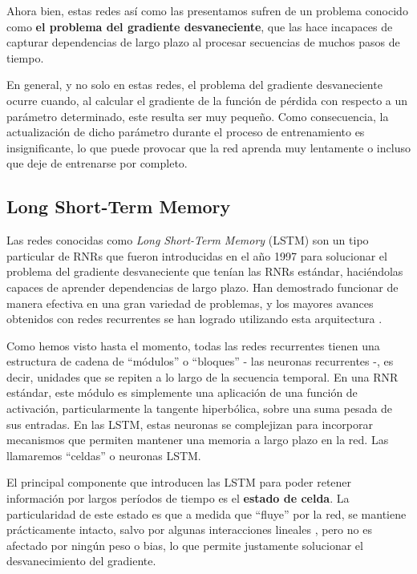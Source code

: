 \documentclass[../../main.tex]{subfiles}
\begin{document}
Ahora bien, estas redes así como las presentamos sufren de un problema conocido como
\textbf{el problema del gradiente desvaneciente}, que las hace incapaces de capturar
dependencias de largo plazo al procesar secuencias de muchos pasos de tiempo.

En general, y no solo en estas redes, el problema del gradiente desvaneciente ocurre
cuando, al calcular el gradiente de la función de pérdida con respecto a un parámetro
determinado, este resulta ser muy pequeño. Como consecuencia, la actualización de dicho
parámetro durante el proceso de entrenamiento es insignificante, lo que puede provocar que
la red aprenda muy lentamente o incluso que deje de entrenarse por completo.

\subsection{Long Short-Term Memory}
Las redes conocidas como \textit{Long Short-Term Memory} (LSTM) son un tipo particular de
RNRs que fueron introducidas en el año 1997 \cite{lstm-paper-1997} para solucionar el
problema del gradiente desvaneciente que tenían las RNRs estándar, haciéndolas capaces
de aprender dependencias de largo plazo. Han demostrado funcionar de manera efectiva en
una gran variedad de problemas, y los mayores avances obtenidos con redes recurrentes se
han logrado utilizando esta arquitectura \cite{colahs-blog-lstm-2015}.

Como hemos visto hasta el momento, todas las redes recurrentes tienen una estructura de
cadena de ``módulos'' o ``bloques'' \cite{colahs-blog-lstm-2015} - las neuronas
recurrentes -, es decir, unidades que se repiten a lo largo de la secuencia temporal. En
una RNR estándar, este módulo es simplemente una aplicación de una función de activación,
particularmente la tangente hiperbólica, sobre una suma pesada de sus entradas. En las
LSTM, estas neuronas se complejizan para incorporar mecanismos que permiten mantener
una memoria a largo plazo en la red. Las llamaremos ``celdas'' o neuronas LSTM.

El principal componente que introducen las LSTM para poder retener información por largos
períodos de tiempo es el \textbf{estado de celda}. La particularidad de este estado es que
a medida que ``fluye'' por la red, se mantiene prácticamente intacto, salvo por algunas
interacciones lineales \cite{colahs-blog-lstm-2015}, pero no es afectado por ningún peso o
bias, lo que permite justamente solucionar el desvanecimiento del gradiente.
\end{document}
